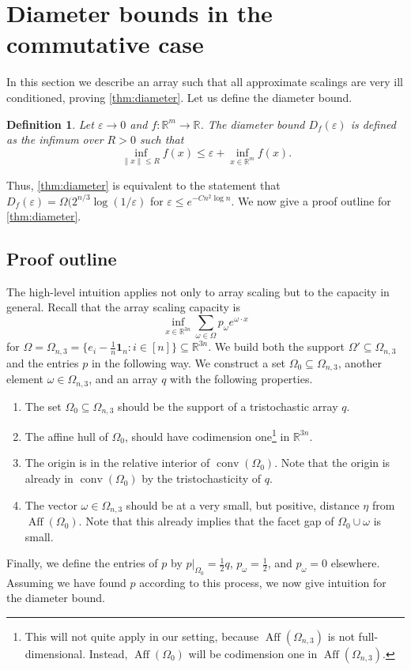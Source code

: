 \documentclass[10pt,a4paper]{article}
\newtheorem{dfn}[thm]{Definition}\crefname{dfn}{Definition}{Definitions}
\numberwithin{equation}{section}
\DeclareMathOperator{\aff}{Aff}
\DeclareMathOperator{\conv}{conv}
\newcommand{\RR}{\mathbb R}
\newcommand{\eps}{\varepsilon}
\newcommand{\id}{\mathbf{1}}
\begin{document}
\setcounter{section}{2}\section{Diameter bounds in the commutative case}\label{sec:diameterComm}


In this section we describe an array such that all approximate scalings are very ill conditioned, proving \cref{thm:diameter}. Let us define the diameter bound.
\begin{dfn}\label{dfn:diameterBound} Let $\eps \to 0$ and $f:\RR^m \to \RR$. The \emph{diameter bound} $D_f(\eps)$ is defined as the infimum over $R > 0$ such that 
$$ \inf_{\|x\| \leq R} f(x) \leq \eps + \inf_{x \in \RR^m}f(x).$$
\end{dfn}
Thus, \cref{thm:diameter} is equivalent to the statement that $D_f(\eps) = \Omega(2^{n/3} \log (1/\eps)$ for $\eps \leq e^{- C n^2 \log n}$. We now give a proof outline for \cref{thm:diameter}. 

\subsection{Proof outline}\label{subsec:outline}

The high-level intuition applies not only to array scaling but to the capacity in general. Recall that the array scaling capacity is 
$$ \inf_{x \in \RR^{3n}}  \sum_{\omega \in \Omega} p_{\omega} e^{\omega \cdot x} $$ for $\Omega =  \Omega_{n,3} = \{e_i - \frac1n \id_n: i \in [n]\} \subseteq \RR^{3n}$. We build both the support $\Omega'\subseteq \Omega_{n,3}$ and the entries $p$ in the following way. We construct a set $\Omega_0 \subseteq \Omega_{n,3}$, another element $\omega \in \Omega_{n,3}$, and an array $q$ with the following properties.
\begin{enumerate}
\item The set $\Omega_0 \subseteq \Omega_{n,3}$ should be the support of a tristochastic array $q$. 
\item The affine hull of $\Omega_0$, should have codimension one\footnote{This will not quite apply in our setting, because $\aff(\Omega_{n,3})$ is not full-dimensional. Instead, $\aff (\Omega_0)$ will be codimension one in $\aff(\Omega_{n,3})$.} in $\RR^{3n}.$ 
\item The origin is in the relative interior of $\conv(\Omega_0)$. Note that the origin is already in $\conv(\Omega_0)$ by the tristochasticity of $q$.
\item The vector $\omega \in \Omega_{n,3}$ should be at a very small, but positive, distance $\eta$ from $\aff (\Omega_0)$. Note that this already implies that the facet gap of $\Omega_0 \cup \omega$ is small.
\end{enumerate}
Finally, we define the entries of $p$ by $p|_{\Omega_0} = \frac{1}{2} q$, $p_\omega = \frac{1}{2}$, and $p_\omega = 0$ elsewhere. Assuming we have found $p$ according to this process, we now give intuition for the diameter bound.
\end{document}
